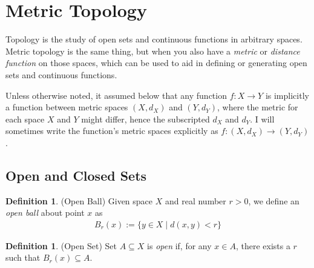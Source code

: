 \documentclass[12pt]{article}
\numberwithin{equation}{section} %
\theoremstyle{plain}
\theoremstyle{definition}
\newtheorem{defn}[thm]{Definition}
\theoremstyle{remark}
\begin{document}
\section{Metric Topology}

Topology is the study of open sets and continuous functions in arbitrary
spaces. Metric topology is the same thing, but when you also have a
\emph{metric} or \emph{distance function} on those spaces, which can be
used to aid in defining or generating open sets and continuous
functions.

Unless otherwise noted, it assumed below that any function
$f:X\rightarrow Y$ is implicitly a function between metric spaces
$(X,d_X)$ and $(Y,d_Y)$, where the metric for each space $X$ and $Y$
might differ, hence the subscripted $d_X$ and $d_Y$.
I will sometimes write the function's metric spaces explicitly as
$f:(X,d_X)\rightarrow(Y,d_Y)$.

\subsection{Open and Closed Sets}

\begin{defn}{(Open Ball)}
Given space $X$ and real number $r>0$, we define an \emph{open ball}
about point $x$ as
\begin{align*}
  B_r(x) := \{ y \in X \;|\; d(x,y)<r\}
\end{align*}
\end{defn}

\begin{defn}{(Open Set)}
Set $A\subseteq X$ is \emph{open} if, for any $x\in A$, there exists a
$r$ such that $B_r(x)\subseteq A$.
\end{defn}
\end{document}
